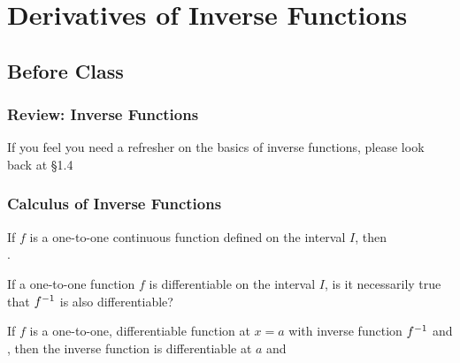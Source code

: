 \documentclass[notes]{subfiles}
\begin{document}
	\fancyhead[LO,RE]{\bfseries \small \currentname}
	\fancyfoot[C]{{}}
	\fancyfoot[LO,RE]{\large \thepage}	%
	
\section*{Derivatives of Inverse Functions}\label{cs37}			
	\subsection*{Before Class}
	\subsubsection*{Review: Inverse Functions}
		\begin{rmk}
			If you feel you need a refresher on the basics of inverse functions, please look back at \S1.4
		\end{rmk}
		
	\subsubsection*{Calculus of Inverse Functions}
		\begin{rmk}
			If \(f\) is a one-to-one continuous function defined on the interval \(I\), then \\[15pt] .
		\end{rmk}
		
		\begin{question}
			If a one-to-one function \(f\) is differentiable on the interval \(I\), is it necessarily true\\[5pt] that \(f^{-1}\) is also differentiable?  
		\end{question}
			\newpage
			
		\begin{rmk}
			If \(f\) is a one-to-one, differentiable function at \(x = a\) with inverse function \(f^{-1}\) and \\[15pt] , then the inverse function is differentiable at \(a\) and \\ \\ \\ \\
		\end{rmk}
		
\end{document}
